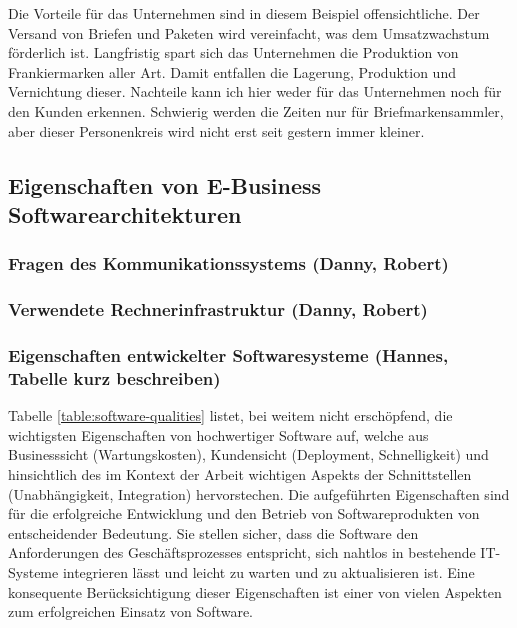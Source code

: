 \documentclass[notitlepage, hidelinks]{article}
\begin{document}
Die Vorteile für das Unternehmen sind in diesem Beispiel offensichtliche. Der Versand von Briefen und Paketen wird vereinfacht, was dem Umsatzwachstum förderlich ist. Langfristig spart sich das Unternehmen die Produktion von Frankiermarken aller Art. Damit entfallen die Lagerung, Produktion und Vernichtung dieser.
Nachteile kann ich hier weder für das Unternehmen noch für den Kunden erkennen. Schwierig werden die Zeiten nur für Briefmarkensammler, aber dieser Personenkreis wird nicht erst seit gestern immer kleiner. 


\subsection{Eigenschaften von E-Business Softwarearchitekturen}
\subsubsection{Fragen des Kommunikationssystems (Danny, Robert)}
\subsubsection{Verwendete Rechnerinfrastruktur (Danny, Robert)}
\subsubsection{Eigenschaften entwickelter Softwaresysteme (Hannes, Tabelle kurz beschreiben)}

Tabelle \ref{table:software-qualities} listet, bei weitem nicht erschöpfend, die wichtigsten Eigenschaften von hochwertiger Software auf, welche aus Businesssicht (Wartungskosten), Kundensicht (Deployment, Schnelligkeit) und hinsichtlich des im Kontext der Arbeit wichtigen Aspekts der Schnittstellen (Unabhängigkeit, Integration) hervorstechen. Die aufgeführten Eigenschaften sind für die erfolgreiche Entwicklung und den Betrieb von Softwareprodukten von entscheidender Bedeutung. Sie stellen sicher, dass die Software den Anforderungen des Geschäftsprozesses entspricht, sich nahtlos in bestehende IT-Systeme integrieren lässt und leicht zu warten und zu aktualisieren ist. Eine konsequente Berücksichtigung dieser Eigenschaften ist einer von vielen Aspekten zum erfolgreichen Einsatz von Software.
\end{document}
